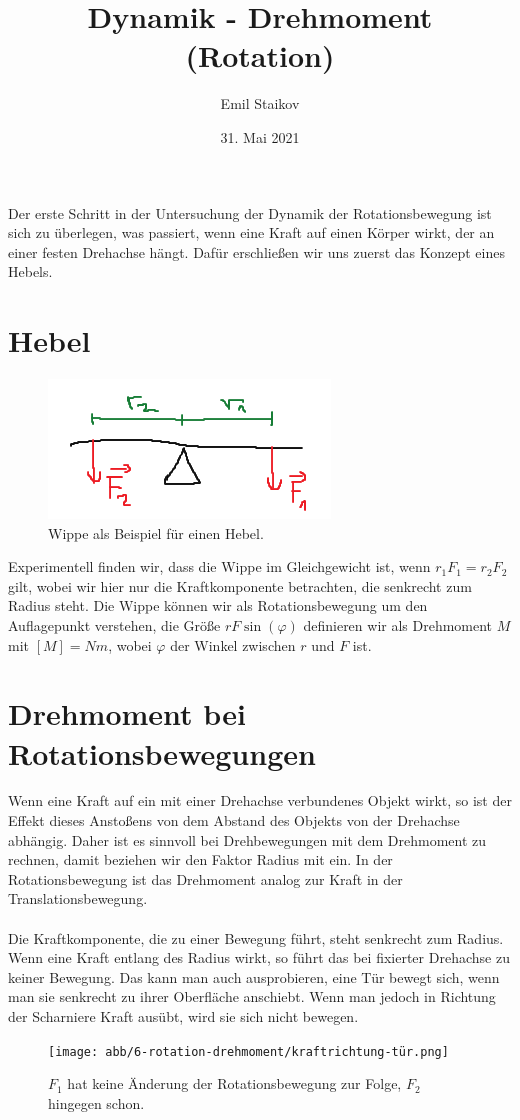 \documentclass[11pt]{article}
\title{Dynamik - Drehmoment (Rotation)}
\author{Emil Staikov}
\date{31. Mai 2021}
\begin{document}
\maketitle
Der erste Schritt in der Untersuchung der Dynamik der Rotationsbewegung ist sich zu überlegen, was passiert, wenn eine Kraft auf einen Körper wirkt, der an einer festen Drehachse hängt. Dafür erschließen wir uns zuerst das Konzept eines Hebels. 

\section{Hebel}
\begin{figure}[H]
        \centering
        \includegraphics[]{abb/6-rotation-drehmoment/wippe.png}
        \caption{Wippe als Beispiel für einen Hebel.}
\end{figure}

Experimentell finden wir, dass die Wippe im Gleichgewicht ist, wenn $r_1F_1 = r_2F_2$ gilt, wobei wir hier nur die Kraftkomponente betrachten, die senkrecht zum Radius steht. Die Wippe können wir als Rotationsbewegung um den Auflagepunkt verstehen, die Größe $rF\sin(\varphi)$ definieren wir als Drehmoment $M$ mit $[M] = Nm$, wobei $\varphi$ der Winkel zwischen $r$ und $F$ ist. 

\section{Drehmoment bei Rotationsbewegungen}
Wenn eine Kraft auf ein mit einer Drehachse verbundenes Objekt wirkt, so ist der Effekt dieses Anstoßens von dem Abstand des Objekts von der Drehachse abhängig. Daher ist es sinnvoll bei Drehbewegungen mit dem Drehmoment zu rechnen, damit beziehen wir den Faktor Radius mit ein. In der Rotationsbewegung ist das Drehmoment analog zur Kraft in der Translationsbewegung. \\\\
Die Kraftkomponente, die zu einer Bewegung führt, steht senkrecht zum Radius. Wenn eine Kraft entlang des Radius wirkt, so führt das bei fixierter Drehachse zu keiner Bewegung. Das kann man auch ausprobieren, eine Tür bewegt sich, wenn man sie senkrecht zu ihrer Oberfläche anschiebt. Wenn man jedoch in Richtung der Scharniere Kraft ausübt, wird sie sich nicht bewegen. 
\begin{figure}[H]
        \centering
        \texttt{[image: abb/6-rotation-drehmoment/kraftrichtung-tür.png]}
        \caption{$F_1$ hat keine Änderung der Rotationsbewegung zur Folge, $F_2$ hingegen schon.}
\end{figure}
\end{document}
